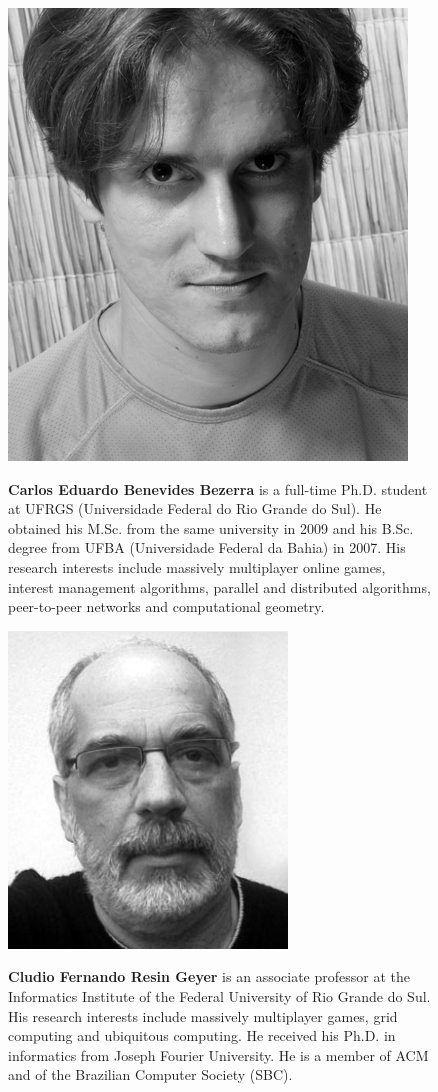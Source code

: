 
\begin{figure}[h]
	\includegraphics[width=0.3\linewidth]{images/Fig-Bezerra.jpg}

	\textbf{Carlos Eduardo Benevides Bezerra} is a full-time Ph.D. student at UFRGS (Universidade Federal do Rio Grande do Sul). He obtained his M.Sc. from the same university in 2009 and his B.Sc. degree from UFBA (Universidade Federal da Bahia) in 2007. His research interests include massively multiplayer online games, interest management algorithms, parallel and distributed algorithms, peer-to-peer networks and computational geometry.
\label{fig:cebb}       %
\end{figure}

\begin{figure}[h]
  \includegraphics[width=0.3\linewidth]{images/Fig-Geyer.jpg}

  \textbf{Cludio Fernando Resin Geyer} is an associate professor at the Informatics Institute of the Federal University of Rio Grande do Sul. His research interests include massively multiplayer games, grid computing and ubiquitous computing. He received his Ph.D. in informatics from Joseph Fourier University. He is a member of ACM and of the Brazilian Computer Society (SBC).


\label{fig:geyer}       %
\end{figure}



